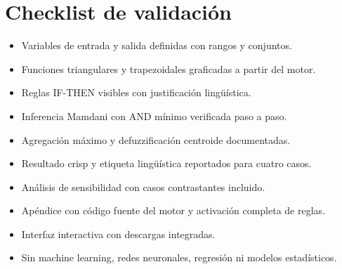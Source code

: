 \section{Checklist de validación}

\begin{itemize}
  \item Variables de entrada y salida definidas con rangos y conjuntos.
  \item Funciones triangulares y trapezoidales graficadas a partir del motor.
  \item Reglas IF-THEN visibles con justificación lingüística.
  \item Inferencia Mamdani con AND mínimo verificada paso a paso.
  \item Agregación máximo y defuzzificación centroide documentadas.
  \item Resultado crisp y etiqueta lingüística reportados para cuatro casos.
  \item Análisis de sensibilidad con casos contrastantes incluido.
  \item Apéndice con código fuente del motor y activación completa de reglas.
  \item Interfaz interactiva con descargas integradas.
  \item Sin machine learning, redes neuronales, regresión ni modelos estadísticos.
\end{itemize}
